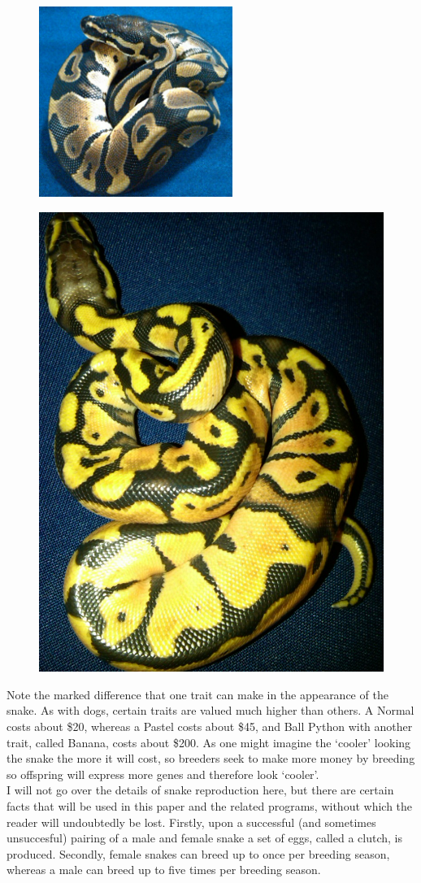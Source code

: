 \documentclass{article}
\begin{document}
	\begin{multicols}{2}
	\begin{figure}[H]
	\centering
	\includegraphics[width=.5\textwidth, height = 62mm]{Normal.jpg}
	\end{figure}
	\begin{figure}[H]
	\centering
	\includegraphics[width=.5\textwidth]{Pastel.jpg}
	\end{figure}
	\end{multicols}
	Note the marked difference that one trait can make in the appearance of the snake. As with dogs, certain traits are valued much higher than others. A Normal costs about \$20, whereas a Pastel costs about \$45, and Ball Python with another trait, called Banana, costs about \$200. As one might imagine the `cooler' looking the snake the more it will cost, so breeders seek to make more money by breeding so offspring will express more genes and therefore look `cooler'.\\
	\indent I will not go over the details of snake reproduction here, but there are certain facts that will be used in this paper and the related programs, without which the reader will undoubtedly be lost. Firstly, upon a successful (and sometimes unsuccesful) pairing of a male and female snake a set of eggs, called a clutch, is produced. Secondly, female snakes can breed up to once per breeding season, whereas a male can breed up to five times per breeding season.
\end{document}
